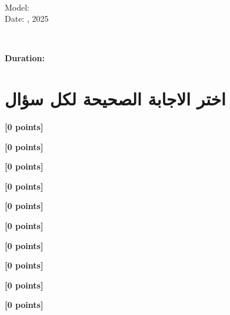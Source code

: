 \documentclass[12pt]{article}
\begin{document}
\begin{flushright}
{\Large \textbf{}}\\[0.25em]
{\normalsize \textenglish{Model: }}\\[0.1em]
{\normalsize \textenglish{Date: }, 2025}
\end{flushright}

\vspace{0.6cm}

\noindent
\begin{minipage}[t]{0.65\textwidth}
  \raggedright
  \textbf{}\\[0.3em]
\end{minipage}\hfill
\begin{minipage}[t]{0.3\textwidth}
  \raggedleft
  \textenglish{\textbf{Duration: }}
\end{minipage}

\vspace{0.9cm}

\section*{اختر الاجابة الصحيحة لكل سؤال}

\noindent 

\hfill \textbf{[0 points]}\vspace{0.6em}

\noindent 

\hfill \textbf{[0 points]}\vspace{0.6em}

\noindent 

\hfill \textbf{[0 points]}\vspace{0.6em}

\noindent 

\hfill \textbf{[0 points]}\vspace{0.6em}

\noindent 

\hfill \textbf{[0 points]}\vspace{0.6em}

\noindent 

\hfill \textbf{[0 points]}\vspace{0.6em}

\noindent 

\hfill \textbf{[0 points]}\vspace{0.6em}

\noindent 

\hfill \textbf{[0 points]}\vspace{0.6em}

\noindent 

\hfill \textbf{[0 points]}\vspace{0.6em}

\noindent 

\hfill \textbf{[0 points]}\vspace{0.6em}
\end{document}
